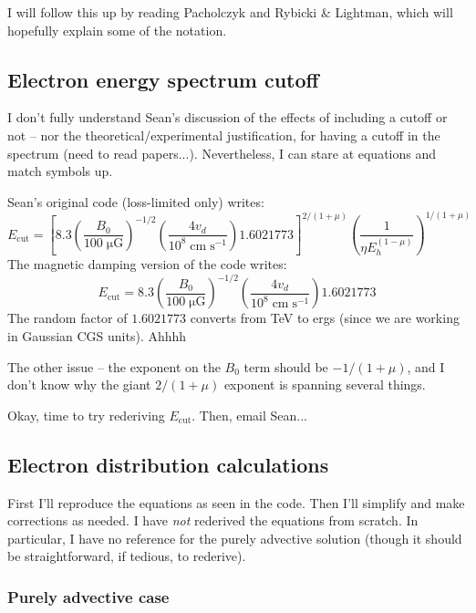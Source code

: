 \documentclass[10pt]{article}
\newcommand{\mt}{\mathrm}
\newcommand{\unit}[1]{\; \mt{#1}} %
\begin{document}
I will follow this up by reading Pacholczyk and Rybicki \& Lightman, which will
hopefully explain some of the notation.

\subsection{Electron energy spectrum cutoff}
I don't fully understand Sean's discussion of the effects of including a cutoff
or not -- nor the theoretical/experimental justification, for having a cutoff
in the spectrum (need to read papers...).  Nevertheless, I can stare at
equations and match symbols up.

Sean's original code (loss-limited only) writes:
\[
    E_{\mt{cut}} = \left[ 8.3 \left( \frac{B_0}{100 \unit{\mu G}} \right)^{-1/2}
                          \left( \frac{4 v_d}{10^8 \unit{cm\;s^{-1}}} \right)
                          1.6021773
                   \right]^{2/(1+\mu)}
                   \left( \frac{1}{\eta E_h^{(1-\mu)}} \right)^{1/(1+\mu)}
\]
The magnetic damping version of the code writes:
\[
    E_{\mt{cut}} = 8.3 \left( \frac{B_0}{100 \unit{\mu G}} \right)^{-1/2}
                   \left( \frac{4 v_d}{10^8 \unit{cm\;s^{-1}}} \right)
                   1.6021773
\]
The random factor of $1.6021773$ converts from TeV to ergs (since we are
working in Gaussian CGS units). Ahhhh

The other issue -- the exponent on the $B_0$ term should be $-1/(1+\mu)$, and I
don't know why the giant $2/(1+\mu)$ exponent is spanning several things.

Okay, time to try rederiving $E_{\mt{cut}}$.  Then, email Sean...

\subsection{Electron distribution calculations}

First I'll reproduce the equations as seen in the code.  Then I'll 
simplify and make corrections as needed.  I have \emph{not} rederived the
equations from scratch.  In particular, I have no reference for the purely
advective solution (though it should be straightforward, if tedious, to
rederive).

\subsubsection{Purely advective case}
\end{document}
